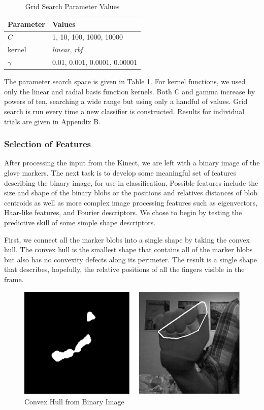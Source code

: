 \documentclass[12pt]{article}
\begin{document}
\begin{table}[H]
\centering
\caption{Grid Search Parameter Values}
\label{table:gridsearch}
\begin{tabular}{ |l|l| }
\hline
\textbf{Parameter} & \textbf{Values} \\ \hline
\( C \) &  1, 10, 100, 1000, 10000 \\ \hline
kernel & \textit{linear}, \textit{rbf} \\ \hline
\( \gamma \) & 0.01, 0.001, 0.0001, 0.00001 \\ 
\hline
\end{tabular}
\end{table}

The parameter search space is given in Table \ref{table:gridsearch}. For kernel functions, we used only the linear and radial basis function kernels. Both C and gamma increase by powers of ten, searching a wide range but using only a handful of values. Grid search is run every time a new classifier is constructed. Results for individual trials are given in Appendix B.

\subsubsection{Selection of Features}
After processing the input from the Kinect, we are left with a binary image of the glove markers. The next task is to develop some meaningful set of features describing the binary image, for use in classification. Possible features include the size and shape of the binary blobs or the positions and relatives distances of blob centroids as well as more complex image processing features such as eigenvectors, Haar-like features, and Fourier descriptors. We chose to begin by testing the predictive skill of some simple shape descriptors.

First, we connect all the marker blobs into a single shape by taking the convex hull. The convex hull is the smallest shape that contains all of the marker blobs but also has no convexity defects along its perimeter. The result is a single shape that describes, hopefully, the relative positions of all the fingers visible in the frame. 

\begin{figure}[h]
  \centering
  \includegraphics[scale=1]{Hull.png}
  \caption{Convex Hull from Binary Image}
  \label{fig:hull}
\end{figure}
\end{document}
